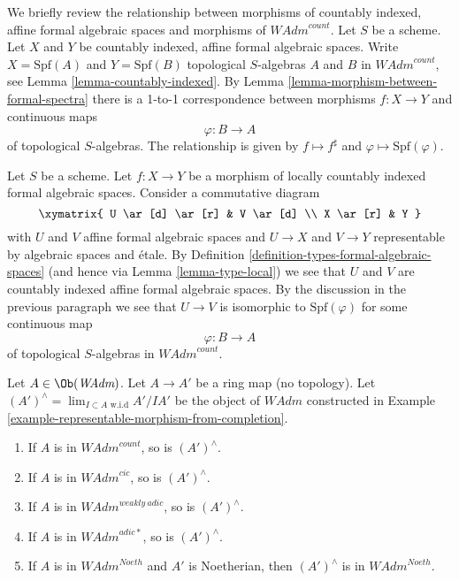 \medskip\noindent
We briefly review the relationship between morphisms of
countably indexed, affine formal algebraic spaces and
morphisms of $\textit{WAdm}^{count}$.
Let $S$ be a scheme. Let $X$ and $Y$ be countably indexed,
affine formal algebraic spaces. Write $X = \text{Spf}(A)$
and $Y = \text{Spf}(B)$ topological $S$-algebras
$A$ and $B$ in $\textit{WAdm}^{count}$, see
Lemma \ref{lemma-countably-indexed}.
By Lemma \ref{lemma-morphism-between-formal-spectra}
there is a 1-to-1 correspondence between morphisms
$f : X \to Y$ and continuous maps
$$
\varphi : B \longrightarrow A
$$
of topological $S$-algebras. The relationship is given by
$f \mapsto f^\sharp$ and $\varphi \mapsto \text{Spf}(\varphi)$.

\medskip\noindent
Let $S$ be a scheme. Let $f : X \to Y$ be a morphism of
locally countably indexed formal algebraic spaces. Consider a
commutative diagram
$$
\xymatrix{
U \ar[d] \ar[r] & V \ar[d] \\
X \ar[r] & Y
}
$$
with $U$ and $V$ affine formal algebraic spaces and $U \to X$ and $V \to Y$
representable by algebraic spaces and \'etale. By
Definition \ref{definition-types-formal-algebraic-spaces} (and hence via
Lemma \ref{lemma-type-local}) we see that $U$ and $V$ are countably indexed
affine formal algebraic spaces. By the discussion in the previous
paragraph we see that $U \to V$ is isomorphic to $\text{Spf}(\varphi)$
for some continuous map
$$
\varphi : B \longrightarrow A
$$
of topological $S$-algebras in $\textit{WAdm}^{count}$.

\begin{lemma}
\label{lemma-completion-in-sub}
Let $A \in \Ob(\textit{WAdm})$. Let $A \to A'$ be a ring
map (no topology). Let $(A')^\wedge = \lim_{I \subset A\text{ w.i.d}} A'/IA'$
be the object of $\textit{WAdm}$ constructed in
Example \ref{example-representable-morphism-from-completion}.
\begin{enumerate}
\item If $A$ is in $\textit{WAdm}^{count}$, so is $(A')^\wedge$.
\item If $A$ is in $\textit{WAdm}^{cic}$, so is $(A')^\wedge$.
\item If $A$ is in $\textit{WAdm}^{weakly\ adic}$, so is $(A')^\wedge$.
\item If $A$ is in $\textit{WAdm}^{adic*}$, so is $(A')^\wedge$.
\item If $A$ is in $\textit{WAdm}^{Noeth}$ and $A'$ is Noetherian, then
$(A')^\wedge$ is in $\textit{WAdm}^{Noeth}$.
\end{enumerate}
\end{lemma}


